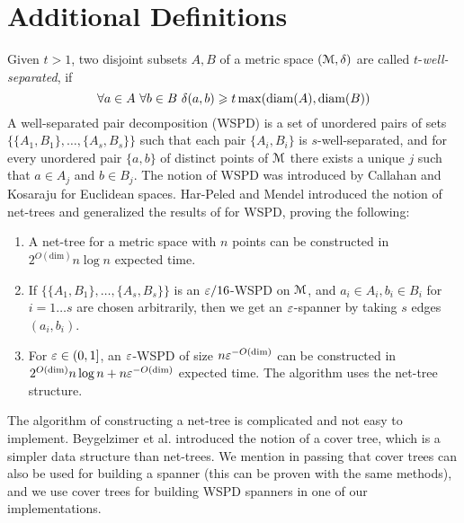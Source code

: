 \section{Additional Definitions}
\label{sec:appendix_background}
Given $t > 1$, two disjoint subsets $A, B$ of a metric space $(\mathcal{M}, \delta)$ are called $t$-\textit{well-separated},
if 
\[
\forall a \in A \,\, \forall b \in B \,\, \delta(a, b) \geqslant t \max(\mathrm{diam}(A), \mathrm{diam}(B))
\]
A well-separated pair decomposition (WSPD) is a set of unordered pairs of sets $\{ \{A_1, B_1 \}, 
\dots, \{A_s, B_s\} \}$ such that each pair $\{A_i, B_i\}$ is $s$-well-separated, and for every unordered pair $\{a, b\}$ 
of distinct points of $\mathcal{M}$ there exists a unique $j$ such that $a \in A_j$ and $b \in B_j$.
The notion of WSPD was introduced by Callahan and Kosaraju \cite{cal-kos-wspd} for Euclidean spaces.
Har-Peled and Mendel \cite{hm-fast} 
introduced the notion of net-trees and
generalized the results of \cite{cal-kos-wspd} for WSPD, proving the following:
\begin{enumerate}
    \item A net-tree for a metric space with $n$ points can be constructed in $2^{O(\mbox{dim})} n \log n$ expected time.
    \item If $\{ \{A_1, B_1 \}, 
\dots, \{A_s, B_s\} \}$ is an $\varepsilon / 16$-WSPD on $\mathcal{M}$, and $a_i \in A_i, b_i \in B_i$ for $i = 1\dots s$
are chosen arbitrarily, then we get an $\varepsilon$-spanner by taking $s$ edges $(a_i, b_i)$.
    \item For $\varepsilon \in (0, 1]$,  an $\varepsilon$-WSPD of size $n \varepsilon^{-O({\dim})}$ can be constructed in $2^{O({\dim})} n \log n + n \varepsilon ^{-O({\dim})}$ expected time. The algorithm uses the net-tree structure.
\end{enumerate}
The algorithm of constructing a net-tree is complicated and not easy to implement. Beygelzimer
et al. \cite{cover-trees} introduced the notion of a cover tree, which is a simpler data structure 
than net-trees. We mention in passing that cover trees can also be used for building
a spanner (this can be proven with the same methods), and we use cover trees for
building WSPD spanners in one of our implementations.




